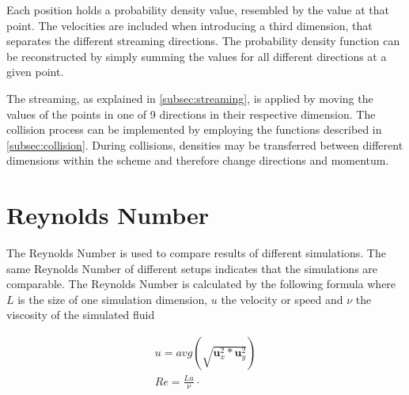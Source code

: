 Each position holds a probability density value, resembled by the value at that point.
The velocities are included when introducing a third dimension, that separates the different streaming directions.
The probability density function can be reconstructed by simply summing the values for all different directions at a given point.
\newline

The streaming, as explained in \cref{subsec:streaming}, is applied by moving the values of the points in one of 9 directions in their respective dimension.
The collision process can be implemented by employing the functions described in \cref{subsec:collision}.
During collisions, densities may be transferred between different dimensions within the scheme and therefore change directions and momentum.
\pagebreak


\section{Reynolds Number}\label{sec:reynolds-number}
The Reynolds Number is used to compare results of different simulations.
The same Reynolds Number of different setups indicates that the simulations are comparable.
The Reynolds Number is calculated by the following formula where $L$ is the size of one simulation dimension, $u$ the velocity or speed and $\nu$ the viscosity of the simulated fluid

\begin{equation*}
    \begin{gathered}
        u = avg(\sqrt{\mathbf u_x^2 * \mathbf u_y^2}) \\
        Re = \frac{L u}{\nu} \cdot
    \end{gathered}
\end{equation*}

